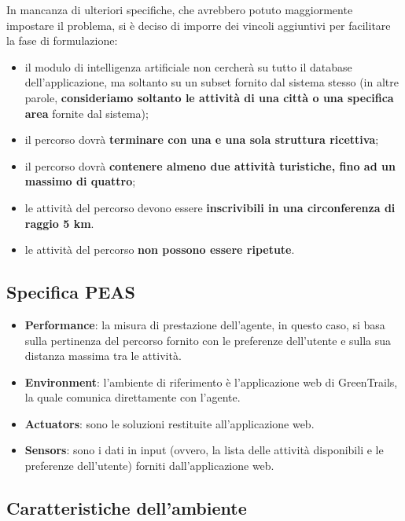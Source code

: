 \documentclass{CSUniSchoolLabReport}
\begin{document}
In mancanza di ulteriori specifiche, che avrebbero potuto maggiormente impostare il problema, si è deciso di imporre dei vincoli aggiuntivi per facilitare la fase di formulazione:
\begin{itemize}
	\item il modulo di intelligenza artificiale non cercherà su tutto il database dell'applicazione, ma soltanto su un subset fornito dal sistema stesso (in altre parole, \textbf{consideriamo soltanto le attività di una città o una specifica area} fornite dal sistema);
	\item il percorso dovrà \textbf{terminare con una e una sola struttura ricettiva};
	\item il percorso dovrà \textbf{contenere almeno due attività turistiche, fino ad un massimo di quattro};
	\item le attività del percorso devono essere \textbf{inscrivibili in una circonferenza di raggio 5 km}.
    \item le attività del percorso \textbf{non possono essere ripetute}.
\end{itemize}

\pagebreak

\subsection{Specifica PEAS}

\begin{itemize}
 \item \textbf{Performance}: la misura di prestazione dell'agente, in questo caso, si basa sulla pertinenza del percorso fornito con le preferenze dell'utente e sulla sua distanza massima tra le attività.
 \item \textbf{Environment}: l'ambiente di riferimento è l'applicazione web di GreenTrails, la quale comunica direttamente con l'agente.
 \item \textbf{Actuators}: sono le soluzioni restituite all'applicazione web.
 \item \textbf{Sensors}: sono i dati in input (ovvero, la lista delle attività disponibili e le preferenze dell'utente) forniti dall'applicazione web.
\end{itemize}


\subsection{Caratteristiche dell'ambiente}
\end{document}
